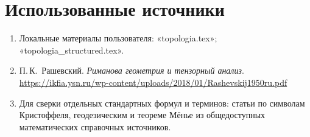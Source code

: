 \documentclass[12pt,a4paper]{article}
\begin{document}
\section{Использованные источники}

\begin{enumerate}
  \item Локальные материалы пользователя:
  «topologia.tex»;
  «topologia\_structured.tex».
  \item П.\,К.~Рашевский. \textit{Риманова геометрия и тензорный анализ}.
  \url{https://ikfia.ysn.ru/wp-content/uploads/2018/01/Rashevskij1950ru.pdf}
  \item Для сверки отдельных стандартных формул и терминов:
  статьи по символам Кристоффеля, геодезическим и теореме Мёнье
  из общедоступных математических справочных источников.
\end{enumerate}
\end{document}
